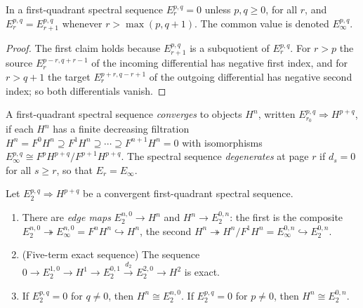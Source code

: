 \begin{lemma}\label{spectral-sequences:lemma-first-quadrant-stable}
In a first-quadrant spectral sequence $E_r^{p,q} = 0$ unless $p, q \geq 0$, for all $r$, and $E_r^{p,q} = E_{r+1}^{p,q}$ whenever
$r > \max(p, q + 1)$. The common value is denoted $E_\infty^{p,q}$.
\end{lemma}

\begin{proof}
The first claim holds because $E_{r+1}^{p,q}$ is a subquotient of $E_r^{p,q}$. For $r > p$ the source $E_r^{p-r, q+r-1}$ of the incoming
differential has negative first index, and for $r > q + 1$ the target $E_r^{p+r, q-r+1}$ of the outgoing differential has negative
second index; so both differentials vanish.
\end{proof}

\begin{definition}\label{spectral-sequences:definition-convergence}
A first-quadrant spectral sequence \emph{converges} to objects $H^n$, written $E_{r_0}^{p,q} \Rightarrow H^{p+q}$, if each $H^n$ has a
finite decreasing filtration $H^n = F^0H^n \supseteq F^1H^n \supseteq \cdots \supseteq F^{n+1}H^n = 0$ with isomorphisms
$E_\infty^{p,q} \cong F^pH^{p+q}/F^{p+1}H^{p+q}$. The spectral sequence \emph{degenerates} at page $r$ if $d_s = 0$ for all
$s \geq r$, so that $E_r = E_\infty$.
\end{definition}

\begin{proposition}\label{spectral-sequences:proposition-edge-maps}
Let $E_2^{p,q} \Rightarrow H^{p+q}$ be a convergent first-quadrant spectral sequence.
\begin{enumerate}
\item There are \emph{edge maps} $E_2^{n,0} \to H^n$ and $H^n \to E_2^{0,n}$: the first is the composite
$E_2^{n,0} \twoheadrightarrow E_\infty^{n,0} = F^nH^n \hookrightarrow H^n$, the second $H^n \twoheadrightarrow H^n/F^1H^n = E_\infty^{0,n} \hookrightarrow E_2^{0,n}$.
\item (Five-term exact sequence) The sequence
$0 \to E_2^{1,0} \to H^1 \to E_2^{0,1} \xrightarrow{d_2} E_2^{2,0} \to H^2$ is exact.
\item If $E_2^{p,q} = 0$ for $q \neq 0$, then $H^n \cong E_2^{n,0}$. If $E_2^{p,q} = 0$ for $p \neq 0$, then $H^n \cong E_2^{0,n}$.
\end{enumerate}
\end{proposition}

